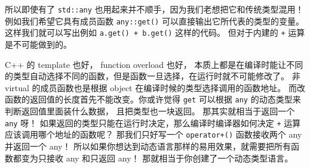 所以即使有了 \verb`std::any` 也用起来并不顺手，因为我们老想把它和传统类型混用！例如我们希望它具有成员函数 \verb`any::get()` 可以直接输出它所代表的类型的变量。 这样我们就可以写出例如 \verb`a.get() + b.get()` 这样的代码。 但对于内建的 \verb`+` 运算是不可能做到的。

C++ 的 template 也好， function overload 也好， 本质上都是在编译时能让不同的类型自动选择不同的函数，但是函数一旦选择，在运行时就不可能修改了。 非 virtual 的成员函数也是根据 object 在编译时候的类型选择调用的函数地址。 而改函数的返回值的长度首先不能改变。你或许觉得 \verb`get` 可以根据 \verb`any` 的动态类型来判断返回值里面装什么数据， 且把类型也一块返回。 那其实就相当于返回一个 \verb`any` 呀！ 如果返回的类型只能在运行时决定，那么编译时编译器如何决定 \verb`+` 运算应该调用哪个地址的函数呢？ 那我们只好写一个 \verb`operator+()` 函数接收两个 any 并返回一个 any！ 所以如果你想达到动态语言那样的易用效果，就需要把所有函数都变为只接收 any 和只返回 any！ 那就相当于你创建了一个动态类型语言。
